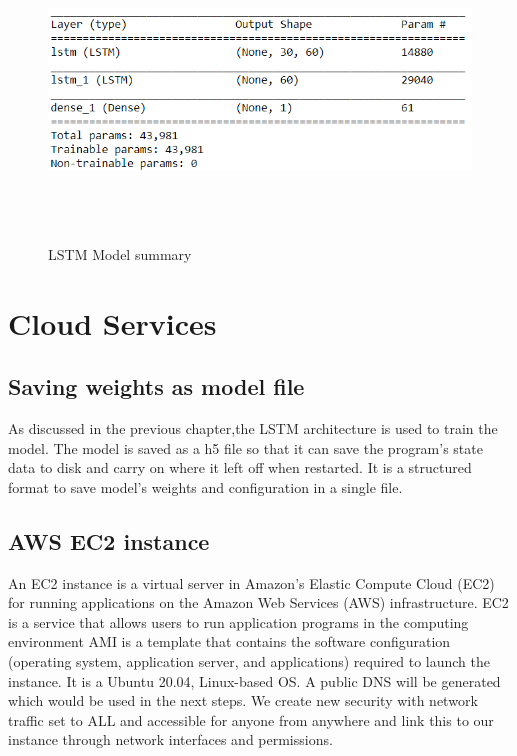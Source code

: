 \documentclass[12 pt]{report}
\begin{document}
\begin{figure}[h!]
  \centering
  \includegraphics[width=16cm,height = 8cm,frame]{images/modelsummary.png}
  \caption{LSTM Model summary}
  \label{fig:LSTM Model summary}
  \end{figure}

\newpage 

\section{Cloud Services}
\par 

\subsection{Saving weights as model file}
    As discussed in the previous chapter,the LSTM architecture is used to train the model. The model is saved as a h5 file so that it can save the program’s state data to disk and carry on where it left off when restarted. It is a structured format to save model's weights and configuration in a single file.
\newline

\subsection{AWS EC2 instance}
An EC2 instance is a virtual server in Amazon’s Elastic Compute Cloud (EC2) for running applications on the Amazon Web Services (AWS) infrastructure. EC2 is a service that allows users to run application programs in the computing environment AMI is a template that contains the software configuration (operating system, application server, and applications) required to launch the instance. It is a Ubuntu 20.04, Linux-based OS. A public DNS will be generated which would be used in the next steps. We create new security with network traffic set to ALL and accessible for anyone from anywhere and link this to our instance through network interfaces and permissions.
\end{document}
